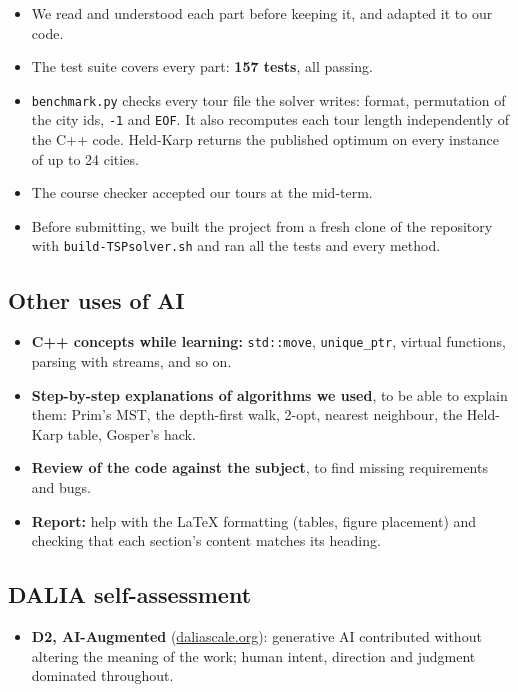 \documentclass[10pt,a4paper]{article}
\begin{document}
\begin{itemize}
    \item We read and understood each part before keeping it, and adapted it to our code.

    \item The test suite covers every part: \textbf{157 tests}, all passing.

    \item \texttt{benchmark.py} checks every tour file the solver writes: format, permutation of the city ids, \texttt{-1} and \texttt{EOF}. It also recomputes each tour length independently of the C++ code. Held-Karp returns the published optimum on every instance of up to 24 cities.

    \item The course checker accepted our tours at the mid-term.

    \item Before submitting, we built the project from a fresh clone of the repository with \texttt{build-TSPsolver.sh} and ran all the tests and every method.
\end{itemize}

\subsection*{Other uses of AI}

\begin{itemize}
    \item \textbf{C++ concepts while learning:} \texttt{std::move}, \texttt{unique\_ptr}, virtual functions, parsing with streams, and so on.

    \item \textbf{Step-by-step explanations of algorithms we used}, to be able to explain them: Prim's MST, the depth-first walk, 2-opt, nearest neighbour, the Held-Karp table, Gosper's hack.

    \item \textbf{Review of the code against the subject}, to find missing requirements and bugs.

    \item \textbf{Report:} help with the LaTeX formatting (tables, figure placement) and checking that each section's content matches its heading.
\end{itemize}

\subsection*{DALIA self-assessment}
\begin{itemize}
  \item \textbf{D2, AI-Augmented} (\href{http://daliascale.org/}{daliascale.org}): generative AI contributed without altering the meaning of the work; human intent, direction and judgment dominated throughout.
\end{itemize}
\end{document}
